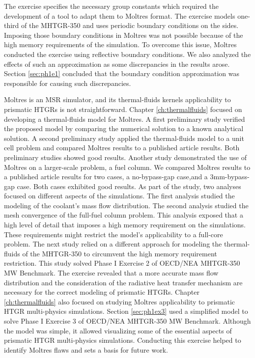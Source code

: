 The exercise specifies the necessary group constants which required the development of a tool to adapt them to Moltres format.
The exercise models one-third of the MHTGR-350 and uses periodic boundary conditions on the sides.
Imposing those boundary conditions in Moltres was not possible because of the high memory requirements of the simulation.
To overcome this issue, Moltres conducted the exercise using reflective boundary conditions.
We also analyzed the effects of such an approximation as some discrepancies in the results arose.
Section \ref{sec:ph1e1} concluded that the boundary condition approximation was responsible for causing such discrepancies.

Moltres is an MSR simulator, and its thermal-fluids kernels applicability to prismatic HTGRs is not straightforward.
Chapter \ref{ch:thermalfluids} focused on developing a thermal-fluids model for Moltres.
A first preliminary study verified the proposed model by comparing the numerical solution to a known analytical solution.
A second preliminary study applied the thermal-fluids model to a unit cell problem and compared Moltres results to a published article results.
Both preliminary studies showed good results.
Another study demonstrated the use of Moltres on a larger-scale problem, a fuel column.
We compared Moltres results to a published article results for two cases, a no-bypass-gap case,and a 3mm-bypass-gap case.
Both cases exhibited good results.
As part of the study, two analyses focused on different aspects of the simulations.
The first analysis studied the modeling of the coolant's mass flow distribution.
The second analysis studied the mesh convergence of the full-fuel column problem.
This analysis exposed that a high level of detail that imposes a high memory requirement on the simulations.
These requirements might restrict the model's applicability to a full-core problem.
The next study relied on a different approach for modeling the thermal-fluids of the MHTGR-350 to circumvent the high memory requirement restriction.
This study solved Phase I Exercise 2 of OECD/NEA MHTGR-350 MW Benchmark.
The exercise revealed that a more accurate mass flow distribution and the consideration of the radiative heat transfer mechanism are necessary for the correct modeling of prismatic HTGRs.
Chapter \ref{ch:thermalfluids} also focused on studying Moltres applicability to prismatic HTGR multi-physics simulations.
Section \ref{sec:ph1ex3} used a simplified model to solve Phase I Exercise 3 of OECD/NEA MHTGR-350 MW Benchmark.
Although the model was simple, it allowed visualizing some of the essential aspects of prismatic HTGR multi-physics simulations.
Conducting this exercise helped to identify Moltres flaws and sets a basis for future work.

